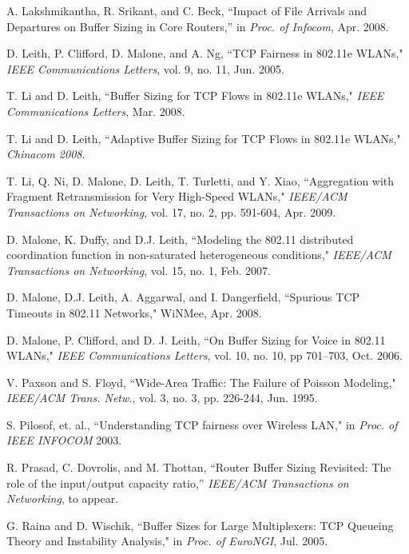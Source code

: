 \documentclass[10pt,twocolumn, journal]{IEEEtran}
\begin{document}
\begin{thebibliography}{}
A. Lakshmikantha, R. Srikant, and C. Beck, ``Impact of File Arrivals and Departures on Buffer Sizing in Core Routers,'' in \emph{Proc. of Infocom}, Apr. 2008.


D. Leith, P. Clifford, D. Malone, and A. Ng,  ``TCP Fairness in 802.11e WLANs,"
\emph{IEEE Communications Letters}, vol. 9, no. 11, Jun. 2005.

T. Li and D. Leith,  ``Buffer Sizing for TCP Flows in 802.11e WLANs," \emph{IEEE
Communications Letters}, Mar. 2008.

T. Li and D. Leith,  ``Adaptive Buffer Sizing for TCP Flows in 802.11e WLANs,"
\emph{Chinacom 2008}.

T. Li, Q. Ni, D. Malone, D. Leith, T. Turletti, and Y. Xiao, ``Aggregation with Fragment
Retransmission for Very High-Speed WLANs,"  \emph{IEEE/ACM Transactions on Networking},
vol. 17, no. 2, pp. 591-604, Apr. 2009.

D. Malone, K. Duffy, and D.J. Leith, ``Modeling the 802.11 distributed coordination
function in non-saturated heterogeneous conditions," \emph{IEEE/ACM Transactions on
Networking}, vol. 15, no. 1, Feb. 2007.

D. Malone, D.J. Leith, A. Aggarwal, and I. Dangerfield,	``Spurious TCP Timeouts in 802.11 Networks," WiNMee,	Apr. 2008.


D. Malone, P. Clifford, and D. J. Leith, ``On Buffer Sizing for Voice in 802.11 WLANs,"
\emph{IEEE Communications Letters}, vol. 10, no. 10, pp 701--703, Oct. 2006.

V. Paxson and S. Floyd, ``Wide-Area Traffic: The Failure of Poisson Modeling,"
\emph{IEEE/ACM Trans. Netw.}, vol. 3, no. 3, pp. 226-244, Jun. 1995.


S. Pilosof, et. al., ``Understanding TCP fairness over Wireless LAN," in \emph{Proc. of
IEEE INFOCOM} 2003.


R. Prasad, C. Dovrolis, and M. Thottan, ``Router Buffer Sizing Revisited: The role of the input/output capacity ratio,'' \emph{IEEE/ACM Transactions on Networking}, to appear.


G. Raina and D. Wischik, ``Buffer Sizes for Large Multiplexers: TCP Queueing Theory and
Instability Analysis," in \emph{Proc. of EuroNGI}, Jul. 2005.



\end{thebibliography}
\end{document}
